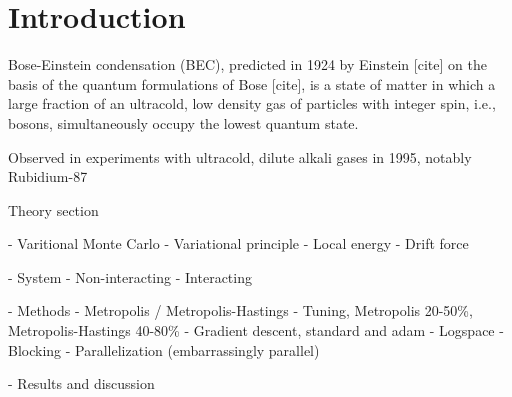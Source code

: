 \section{Introduction}\label{sec:Introduction}

Bose-Einstein condensation (BEC), predicted in 1924 by Einstein [cite] on the basis of the quantum formulations of Bose [cite], is a state of matter in which a large fraction of an ultracold, low density gas of particles with integer spin, i.e., bosons, simultaneously occupy the lowest quantum state. 

Observed in experiments with ultracold, dilute alkali gases in 1995, notably Rubidium-87



Theory section 

- Varitional Monte Carlo 
    - Variational principle 
    - Local energy 
    - Drift force 

- System 
    - Non-interacting 
    - Interacting 
    
- Methods
    - Metropolis / Metropolis-Hastings 
    - Tuning, Metropolis 20-50\%, Metropolis-Hastings 40-80\% 
    - Gradient descent, standard and adam 
    - Logspace
    - Blocking
    - Parallelization (embarrassingly parallel) 
    
- Results and discussion 